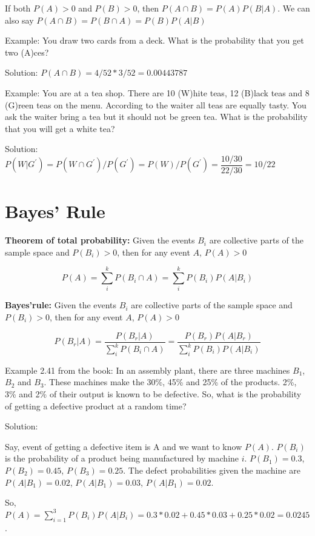 \documentclass[]{book}
\theoremstyle{definition}
\theoremstyle{definition}
\theoremstyle{definition}
\theoremstyle{remark}
\begin{document}
If both \(P(A)>0\) and \(P(B)>0\), then \(P(A\cap B) = P(A)P(B|A)\). We
can also say \(P(A\cap B) = P(B\cap A) = P(B)P(A|B)\)

Example: You draw two cards from a deck. What is the probability that
you get two (A)ces?

Solution: \(P(A \cap B) = 4/52 * 3/52 = 0.00443787\)

Example: You are at a tea shop. There are 10 (W)hite teas, 12 (B)lack
teas and 8 (G)reen teas on the menu. According to the waiter all teas
are equally tasty. You ask the waiter bring a tea but it should not be
green tea. What is the probability that you will get a white tea?

Solution:
\(P(W|G^{\prime}) = P(W \cap G^{\prime})/P(G^{\prime}) = P(W) / P(G^{\prime}) = \dfrac{10/30}{22/30} = 10/22\)

\hypertarget{bayes-rule}{%
\section{Bayes' Rule}\label{bayes-rule}}

\textbf{Theorem of total probability:} Given the events \(B_i\) are
collective parts of the sample space and \(P(B_i) > 0\), then for any
event \(A\), \(P(A) > 0\)

\[P(A) = \sum_i^k P(B_i \cap A) = \sum_i^k P(B_i)P(A|B_i)\]

\textbf{Bayes'rule:} Given the events \(B_i\) are collective parts of
the sample space and \(P(B_i) > 0\), then for any event \(A\),
\(P(A) > 0\)

\[P(B_r|A) = \dfrac{P(B_r|A)}{\sum_i^k P(B_i \cap A)} = \dfrac{P(B_r)P(A|B_r)}{\sum_i^k P(B_i)P(A|B_i)}\]

Example 2.41 from the book: In an assembly plant, there are three
machines \(B_1\), \(B_2\) and \(B_3\). These machines make the 30\%,
45\% and 25\% of the products. 2\%, 3\% and 2\% of their output is known
to be defective. So, what is the probability of getting a defective
product at a random time?

Solution:

Say, event of getting a defective item is A and we want to know
\(P(A)\). \(P(B_i)\) is the probability of a product being manufactured
by machine \(i\). \(P(B_1) = 0.3\), \(P(B_2) = 0.45\),
\(P(B_3) = 0.25\). The defect probabilities given the machine are
\(P(A|B_1) = 0.02\), \(P(A|B_1) = 0.03\), \(P(A|B_1) = 0.02\).

So,
\(P(A) = \sum_{i=1}^3 P(B_i)P(A|B_i) = 0.3*0.02 + 0.45*0.03 + 0.25*0.02 = 0.0245\).
\end{document}
